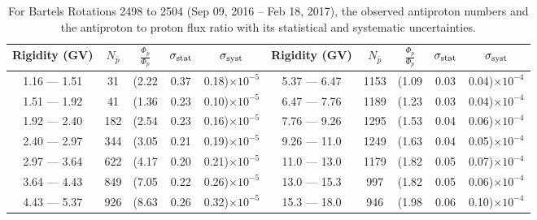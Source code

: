\begin{table}[p] 
\renewcommand\baselinestretch{1.3}\selectfont
\setlength\tabcolsep{3pt}
\centering
\begin{tabular}{ccccc | ccccc}
\hline
\textbf{Rigidity}  (GV)  & $N_{\bar{p}}$ & $\frac{\Phi_{\bar{p}}}{\Phi_{p}}$ & $\sigma_{\rm{stat}}$ & $\sigma_{\rm{syst}}$ \hspace{1cm}   & \textbf{Rigidity}  (GV)  & $N_{\bar{p}}$ & $\frac{\Phi_{\bar{p}}}{\Phi_{p}}$ & $\sigma_{\rm{stat}}$ & $\sigma_{\rm{syst}}$ \hspace{1cm} \\ 
\hline
1.16 — 1.51   &  31                  &(2.22                          &  0.37              &      0.18)$\times 10^{-5}$  & 5.37 — 6.47                &  1153                    &(1.09                                &  0.03                   &      0.04)$\times 10^{-4}$\\
1.51 — 1.92   &  41                  &(1.36                          &  0.23              &      0.10)$\times 10^{-5}$  & 6.47 — 7.76                &  1189                    &(1.23                                &  0.03                   &      0.04)$\times 10^{-4}$\\
1.92 — 2.40   &  182                &(2.54                          &  0.23              &      0.16)$\times 10^{-5}$  & 7.76 — 9.26                &  1295                    &(1.53                                &  0.04                   &      0.06)$\times 10^{-4}$\\    
2.40 — 2.97   &  344                &(3.05                          &  0.21              &      0.19)$\times 10^{-5}$  & 9.26 — 11.0                &  1249                    &(1.63                                &  0.04                   &      0.05)$\times 10^{-4}$\\    
2.97 — 3.64   &  622                &(4.17                          &  0.20              &      0.21)$\times 10^{-5}$  & 11.0 — 13.0                 &  1179                    &(1.82                                &  0.05                   &      0.07)$\times 10^{-4}$\\
3.64 — 4.43   &  849                &(7.05                          &  0.22              &      0.26)$\times 10^{-5}$  & 13.0 — 15.3               &  997                    &(1.82                                &  0.05                   &      0.06)$\times 10^{-4}$\\
4.43 — 5.37   &  926                &(8.63                          &  0.26              &      0.32)$\times 10^{-5}$  & 15.3 — 18.0               &  946                    &(1.98                                &  0.06                   &      0.10)$\times 10^{-4}$\\
\hline
\end{tabular}
\caption[Antiproton to proton flux ratio for Bartels Rotations 2498 to 2504]{For Bartels Rotations 2498 to 2504 (Sep 09, 2016 – Feb 18, 2017), the observed antiproton numbers and the antiproton to proton flux ratio with its statistical and systematic uncertainties.}
\label{TableOfDependent13}
\end{table}

